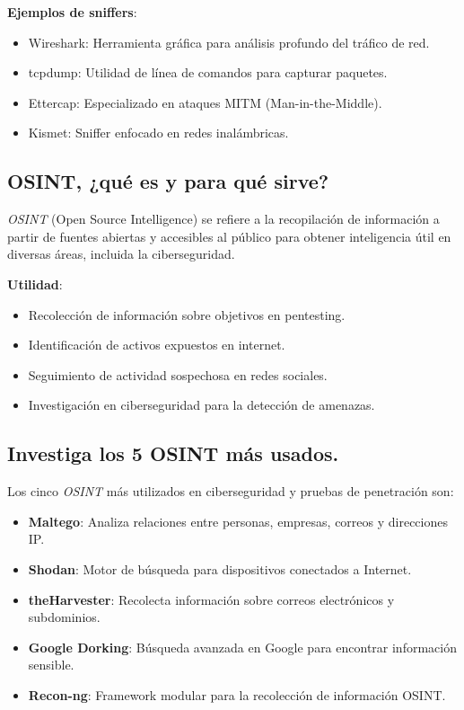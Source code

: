 \textbf{Ejemplos de sniffers}:
\begin{itemize}
    \item Wireshark: Herramienta gráfica para análisis profundo del tráfico de red.
    \item tcpdump: Utilidad de línea de comandos para capturar paquetes.
    \item Ettercap: Especializado en ataques MITM (Man-in-the-Middle).
    \item Kismet: Sniffer enfocado en redes inalámbricas.
\end{itemize}

\subsection{OSINT, ¿qué es y para qué sirve?}
\textit{OSINT} (Open Source Intelligence) se refiere a la recopilación de información a partir de fuentes abiertas y accesibles al público para obtener inteligencia útil en diversas áreas, incluida la ciberseguridad.

\textbf{Utilidad}:
\begin{itemize}
    \item Recolección de información sobre objetivos en pentesting.
    \item Identificación de activos expuestos en internet.
    \item Seguimiento de actividad sospechosa en redes sociales.
    \item Investigación en ciberseguridad para la detección de amenazas.
\end{itemize}

\subsection{Investiga los 5 OSINT más usados.}
Los cinco \textit{OSINT} más utilizados en ciberseguridad y pruebas de penetración son:

\begin{itemize}
    \item \textbf{Maltego}: Analiza relaciones entre personas, empresas, correos y direcciones IP.
    \item \textbf{Shodan}: Motor de búsqueda para dispositivos conectados a Internet.
    \item \textbf{theHarvester}: Recolecta información sobre correos electrónicos y subdominios.
    \item \textbf{Google Dorking}: Búsqueda avanzada en Google para encontrar información sensible.
    \item \textbf{Recon-ng}: Framework modular para la recolección de información OSINT.
\end{itemize}

